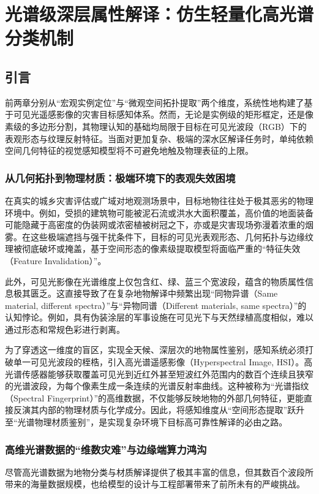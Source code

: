\chapter{光谱级深层属性解译：仿生轻量化高光谱分类机制}

\section{引言}
前两章分别从“宏观实例定位”与“微观空间拓扑提取”两个维度，系统性地构建了基于可见光遥感影像的灾害目标感知体系。然而，无论是实例级的矩形框定，还是像素级的多边形分割，其物理认知的基础均局限于目标在可见光波段（RGB）下的表观形态与纹理反射特征。当面对更加复杂、极端的深水区解译任务时，单纯依赖空间几何特征的视觉感知模型将不可避免地触及物理表征的上限。

\subsection{从几何拓扑到物理材质：极端环境下的表观失效困境}
在真实的城乡灾害评估或广域对地观测场景中，目标地物往往处于极其恶劣的物理环境中。例如，受损的建筑物可能被泥石流或洪水大面积覆盖，高价值的地面装备可能隐藏于高密度的伪装网或浓密植被树冠之下，亦或是灾害现场弥漫着浓重的烟雾。在这些极端遮挡与强干扰条件下，目标的可见光表观形态、几何拓扑与边缘纹理被彻底破坏或掩盖，基于空间形态的像素级提取模型将面临严重的“特征失效（Feature Invalidation）”。

此外，可见光影像在光谱维度上仅包含红、绿、蓝三个宽波段，蕴含的物质属性信息极其匮乏。这直接导致了在复杂地物解译中频繁出现“同物异谱（Same material, different spectra）”与“异物同谱（Different materials, same spectra）”的认知悖论。例如，具有伪装涂层的军事设施在可见光下与天然绿植高度相似，难以通过形态和常规色彩进行剥离。

为了穿透这一维度的盲区，实现全天候、深层次的地物属性鉴别，感知系统必须打破单一可见光波段的桎梏，引入高光谱遥感影像（Hyperspectral Image, HSI）。高光谱传感器能够获取覆盖可见光到近红外甚至短波红外范围内的数百个连续且狭窄的光谱波段，为每个像素生成一条连续的光谱反射率曲线。这种被称为“光谱指纹（Spectral Fingerprint）”的高维数据，不仅能够反映地物的外部几何特征，更能直接反演其内部的物理材质与化学成分。因此，将感知维度从“空间形态提取”跃升至“光谱物理材质鉴别”，是实现复杂环境下目标高可靠性解译的必由之路。

\subsection{高维光谱数据的“维数灾难”与边缘端算力鸿沟}
尽管高光谱数据为地物分类与材质解译提供了极其丰富的信息，但其数百个波段所带来的海量数据规模，也给模型的设计与工程部署带来了前所未有的严峻挑战。

